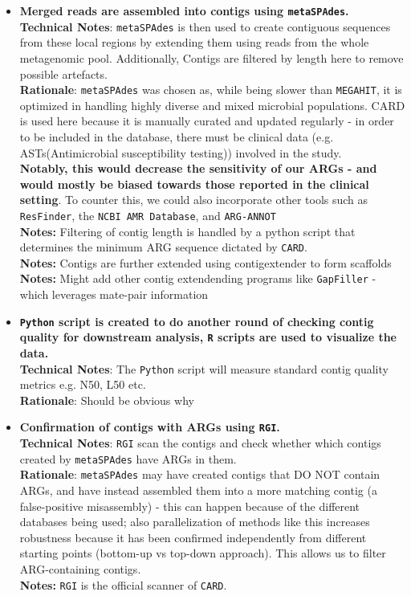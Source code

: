 \documentclass[11pt]{report}
\begin{document}
\begin{itemize}
	\item \textbf{Merged reads are assembled into contigs using \texttt{metaSPAdes}.}\\
	\textbf{Technical Notes}: \texttt{metaSPAdes} is then used to create contiguous sequences from these local regions by extending them using reads from the whole metagenomic pool. Additionally, Contigs are filtered by length here to remove possible artefacts. \\
	\textbf{Rationale}: \texttt{metaSPAdes} was chosen as, while being slower than \texttt{MEGAHIT}, it is optimized in handling highly diverse and mixed microbial populations. CARD is used here because it is manually curated and updated regularly - in order to be included in the database, there must be clinical data (e.g. ASTs(Antimicrobial susceptibility testing)) involved in the study.
\\	 \textbf{Notably, this would decrease the sensitivity of our ARGs - and would mostly be biased towards those reported in the clinical setting}. To counter this, we could also incorporate other tools such as \texttt{ResFinder}, the \texttt{NCBI AMR Database}, and \texttt{ARG-ANNOT}
\\	\textbf{Notes:} Filtering of contig length is handled by a python script that determines the minimum ARG sequence dictated by \texttt{CARD}.
\\	\textbf{Notes:} Contigs are further extended using contigextender to form scaffolds 
\\	\textbf{Notes:} Might add other contig extendending programs like \texttt{GapFiller} - which leverages mate-pair information 
	
	\item \textbf{\texttt{Python} script is created to do another round of checking contig quality for downstream analysis, \texttt{R} scripts are used to visualize the data.} \\
	\textbf{Technical Notes}: The \texttt{Python} script will measure standard contig quality metrics e.g. N50, L50 etc. \\
	\textbf{Rationale}: Should be obvious why
	
	\item \textbf{Confirmation of contigs with ARGs using \texttt{RGI}.}\\
	\textbf{Technical Notes}: \texttt{RGI} scan the contigs and check whether which contigs created by \texttt{metaSPAdes} have ARGs in them. \\
	\textbf{Rationale}: \texttt{metaSPAdes} may have created contigs that DO NOT contain ARGs, and have instead assembled them into a more matching contig (a false-positive misassembly) - this can happen because of the different databases being used; also parallelization of methods like this increases robustness because it has been confirmed independently from different starting points (bottom-up vs top-down approach). This allows us to filter ARG-containing contigs. \\
	\textbf{Notes:} \texttt{RGI} is the official scanner of \texttt{CARD}.
	

\end{itemize}
\end{document}
